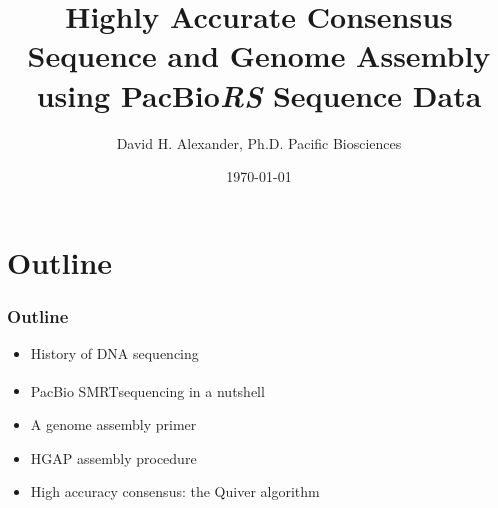 \documentclass[serif,11pt]{beamer}
\title{Highly Accurate Consensus Sequence and Genome Assembly using PacBio\R  \emph{RS} Sequence Data}
\author{David H. Alexander, Ph.D. \newline  Pacific Biosciences}
\date{\today}
\newcommand{\R}{\textsuperscript{\textregistered}}
\begin{document}
\maketitle


\section{Outline}
\label{sec-1}
\begin{frame}
\frametitle{Outline}
\label{sec-1-1}

\begin{itemize}
\item History of DNA sequencing
\item PacBio SMRT\R sequencing in a nutshell
\item A genome assembly primer
\item HGAP assembly procedure
\item High accuracy consensus: the Quiver algorithm
\end{itemize}
\end{frame}
\end{document}
